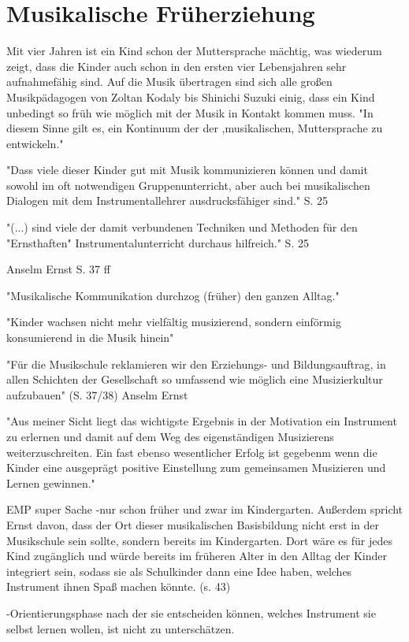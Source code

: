 \section{Musikalische Früherziehung}

Mit vier Jahren ist ein Kind schon der Muttersprache mächtig, was wiederum
zeigt, dass die Kinder auch schon in den ersten vier Lebensjahren sehr
aufnahmefähig sind. Auf die Musik übertragen sind sich alle großen
Musikpädagogen von Zoltan Kodaly bis Shinichi Suzuki einig, dass ein Kind
unbedingt so früh wie möglich mit der Musik in Kontakt kommen muss. "In diesem
Sinne gilt es, ein Kontinuum der der ,musikalischen, Muttersprache zu
entwickeln." \autocite[45]{ernst:die_zukunftsfaehige_musikschule}

"Dass viele dieser Kinder gut mit Musik kommunizieren können und damit sowohl im
oft notwendigen Gruppenunterricht, aber auch bei musikalischen Dialogen mit dem
Instrumentallehrer ausdrucksfähiger sind." S. 25

"(...) sind viele der damit verbundenen Techniken und Methoden für den
"Ernsthaften" Instrumentalunterricht durchaus hilfreich." S. 25

Anselm Ernst S. 37 ff

"Musikalische Kommunikation durchzog (früher) den ganzen Alltag."
\autocite[37]{ernst:die_zukunftsfaehige_musikschule}

"Kinder wachsen nicht mehr vielfältig musizierend, sondern einförmig
konsumierend in die Musik hinein" \autocite[37]{ernst:die_zukunftsfaehige_musikschule}

"Für die Musikschule reklamieren wir den Erziehungs- und Bildungsauftrag, in
allen Schichten der Gesellschaft so umfassend wie möglich eine Musizierkultur
aufzubauen" (S. 37/38) Anselm Ernst

"Aus meiner Sicht liegt das wichtigste Ergebnis in der Motivation ein Instrument
zu erlernen und damit auf dem Weg des eigenständigen Musizierens
weiterzuschreiten. Ein fast ebenso wesentlicher Erfolg ist gegebenm wenn die
Kinder eine ausgeprägt positive Einstellung zum gemeinsamen Musizieren und
Lernen gewinnen." \autocite[40]{ernst:die_zukunftsfaehige_musikschule}


EMP super Sache -nur schon früher und zwar im Kindergarten. 
Außerdem spricht Ernst davon, dass der Ort dieser musikalischen Basisbildung
nicht erst in der Musikschule sein sollte, sondern bereits im Kindergarten. Dort
wäre es für jedes Kind zugänglich und würde bereits im früheren Alter in den
Alltag der Kinder integriert sein, sodass sie als Schulkinder dann eine Idee
haben, welches Instrument ihnen Spaß machen könnte. (s. 43)

-Orientierungsphase nach der sie entscheiden können, welches Instrument sie
selbst lernen wollen, ist nicht zu unterschätzen. 
